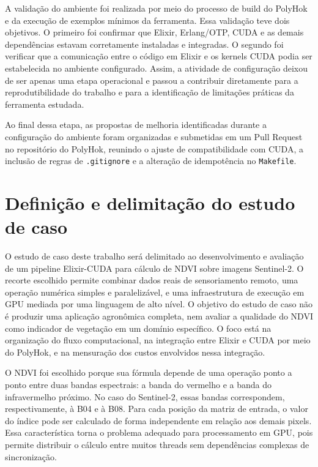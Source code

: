 \documentclass[tcc,capa]{texufpel}
\begin{document}
A validação do ambiente foi realizada por meio do processo de build do PolyHok e da execução de exemplos mínimos da ferramenta. Essa validação teve dois objetivos. O primeiro foi confirmar que Elixir, Erlang/OTP, CUDA e as demais dependências estavam corretamente instaladas e integradas. O segundo foi verificar que a comunicação entre o código em Elixir e os kernels CUDA podia ser estabelecida no ambiente configurado. Assim, a atividade de configuração deixou de ser apenas uma etapa operacional e passou a contribuir diretamente para a reprodutibilidade do trabalho e para a identificação de limitações práticas da ferramenta estudada.

Ao final dessa etapa, as propostas de melhoria identificadas durante a configuração do ambiente foram organizadas e submetidas em um Pull Request no repositório do PolyHok, reunindo o ajuste de compatibilidade com CUDA, a inclusão de regras de \texttt{.gitignore} e a alteração de idempotência no \texttt{Makefile}.

\section{Definição e delimitação do estudo de caso}

O estudo de caso deste trabalho será delimitado ao desenvolvimento e avaliação de um pipeline Elixir-CUDA para cálculo de NDVI sobre imagens Sentinel-2. O recorte escolhido permite combinar dados reais de sensoriamento remoto, uma operação numérica simples e paralelizável, e uma infraestrutura de execução em GPU mediada por uma linguagem de alto nível. O objetivo do estudo de caso não é produzir uma aplicação agronômica completa, nem avaliar a qualidade do NDVI como indicador de vegetação em um domínio específico. O foco está na organização do fluxo computacional, na integração entre Elixir e CUDA por meio do PolyHok, e na mensuração dos custos envolvidos nessa integração.

O NDVI foi escolhido porque sua fórmula depende de uma operação ponto a ponto entre duas bandas espectrais: a banda do vermelho e a banda do infravermelho próximo. No caso do Sentinel-2, essas bandas correspondem, respectivamente, à B04 e à B08. Para cada posição da matriz de entrada, o valor do índice pode ser calculado de forma independente em relação aos demais pixels. Essa característica torna o problema adequado para processamento em GPU, pois permite distribuir o cálculo entre muitos threads sem dependências complexas de sincronização.
\end{document}
